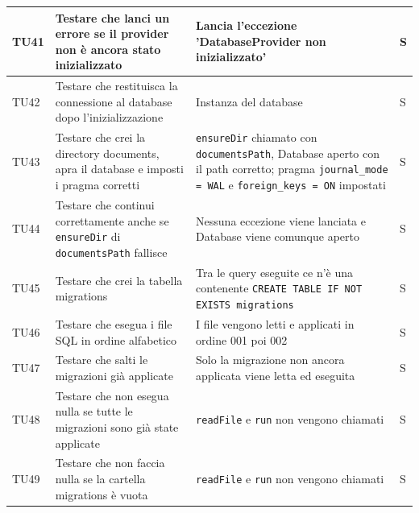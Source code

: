 \documentclass[a4paper,12pt]{article}
\begin{document}
\begin{longtable}{|M{1.2cm}|M{5cm}|M{8cm}|M{1.5cm}|}
            TU41 & Testare che \texttt{} lanci un errore se il provider non è ancora stato inizializzato & Lancia l'eccezione 'DatabaseProvider non inizializzato' & S \\
            \hline

            TU42 & Testare che \texttt{} restituisca la connessione al database dopo l'inizializzazione & Instanza del database & S \\
            \hline

            TU43 & Testare che \texttt{} crei la directory documents, apra il database e imposti i pragma corretti & \texttt{ensureDir} chiamato con \texttt{documentsPath}, Database aperto con il path corretto; pragma \texttt{journal\_mode = WAL} e \texttt{foreign\_keys = ON} impostati & S \\
            \hline

            TU44 & Testare che \texttt{} continui correttamente anche se \texttt{ensureDir} di \texttt{documentsPath} fallisce & Nessuna eccezione viene lanciata e Database viene comunque aperto & S \\
            \hline

            TU45 & Testare che \texttt{} crei la tabella migrations & Tra le query eseguite ce n'è una contenente \texttt{CREATE TABLE IF NOT EXISTS migrations} & S \\
            \hline

            TU46 & Testare che \texttt{} esegua i file SQL in ordine alfabetico & I file vengono letti e applicati in ordine 001 poi 002 & S \\
            \hline

            TU47 & Testare che \texttt{} salti le migrazioni già applicate & Solo la migrazione non ancora applicata viene letta ed eseguita & S \\
            \hline

            TU48 & Testare che \texttt{} non esegua nulla se tutte le migrazioni sono già state applicate & \texttt{readFile} e \texttt{run} non vengono chiamati & S \\
            \hline

            TU49 & Testare che \texttt{} non faccia nulla se la cartella migrations è vuota & \texttt{readFile} e \texttt{run} non vengono chiamati & S \\
            \hline


\end{longtable}
\end{document}
